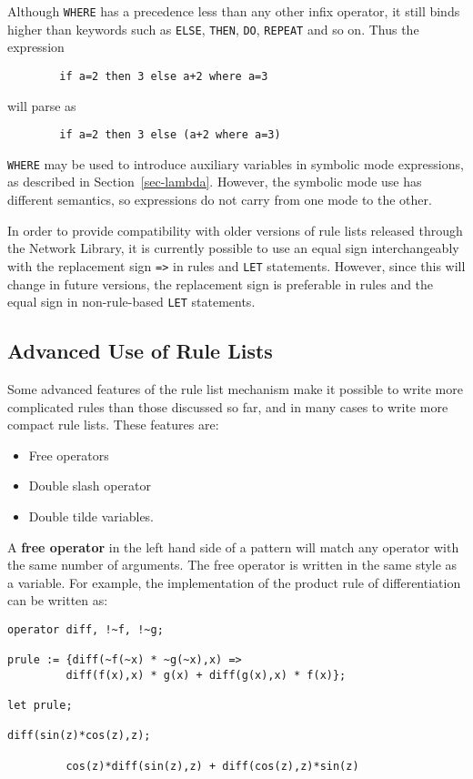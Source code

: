 Although {\tt WHERE} has a precedence less than any other infix operator,
it still binds higher than keywords such as {\tt ELSE}, {\tt THEN},
{\tt DO}, {\tt REPEAT} and so on.  Thus the expression
\begin{verbatim}
        if a=2 then 3 else a+2 where a=3
\end{verbatim}
will parse as
\begin{verbatim}
        if a=2 then 3 else (a+2 where a=3)
\end{verbatim}

{\tt WHERE} may be used to introduce auxiliary variables in symbolic mode
expressions, as described in Section~\ref{sec-lambda}.  However, the
symbolic mode use has different semantics, so expressions do not carry
from one mode to the other.

\COMPATNOTE In order to provide compatibility with older versions of rule
lists released through the Network Library, it is currently possible to use
an equal sign interchangeably with the replacement sign {\tt =>} in rules
and {\tt LET} statements.  However, since this will change in future
versions, the replacement sign is preferable in rules and the equal sign
in non-rule-based {\tt LET} statements.

\subsection*{Advanced Use of Rule Lists}

Some advanced features of the rule list mechanism make it possible to
write more complicated rules than those discussed so far, and in many
cases to write more compact rule lists.  These features are:

\begin{itemize}
\item Free operators
\item Double slash operator
\item Double tilde variables.
\end{itemize}
A {\bf free operator} in the left hand side of a pattern will match any
operator with the same number of arguments.  The free operator is written
in the same style as a variable.  For example, the implementation of the
product rule of differentiation can be written as:
\begin{verbatim}
operator diff, !~f, !~g;

prule := {diff(~f(~x) * ~g(~x),x) =>
	     diff(f(x),x) * g(x) + diff(g(x),x) * f(x)};

let prule;

diff(sin(z)*cos(z),z);

         cos(z)*diff(sin(z),z) + diff(cos(z),z)*sin(z)
\end{verbatim}

